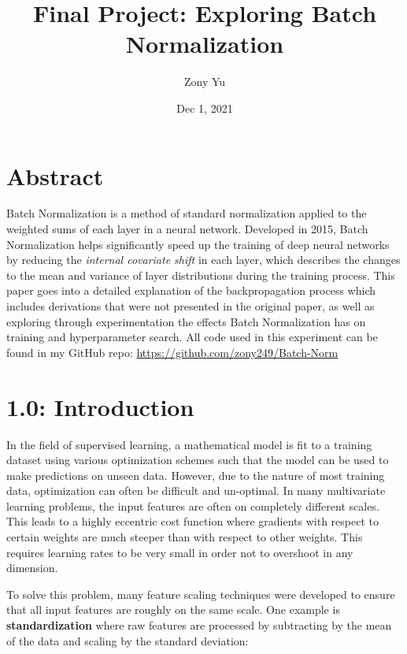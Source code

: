\documentclass{article}
\title{Final Project: Exploring Batch Normalization}
\author{Zony Yu}
\date{Dec 1, 2021}
\begin{document}
\maketitle

\begin{multicols*}{2}






\section*{Abstract}

Batch Normalization is a method of standard normalization applied to the 
weighted sums of each layer in a neural network. Developed in 2015, Batch Normalization
helps significantly speed up the training of deep neural networks by reducing the 
\textit{internal covariate shift} in each layer, which describes the 
changes to the mean and variance of layer distributions during the training process. This
paper goes into a detailed explanation of the backpropagation process which includes
derivations that were not presented in the original paper, as well as exploring through 
experimentation the effects Batch Normalization has on training and hyperparameter search.
All code used in this experiment can be found in my GitHub repo: 
\url{https://github.com/zony249/Batch-Norm}


\section*{1.0: Introduction}
In the field of supervised learning, a mathematical model is fit to 
a training dataset using various optimization schemes such that the model 
can be used to make predictions on unseen data. However, 
due to the nature of most training data, optimization can often be
difficult and un-optimal. In many multivariate learning problems, the input features are
often on completely different scales. This leads to a highly eccentric cost
function where gradients with respect to certain weights are much steeper
than with respect to other weights. This requires learning rates to 
be very small in order not to overshoot in any dimension.

To solve this problem, many feature scaling techniques were developed to ensure
that all input features are roughly on the same scale. One example is \textbf{standardization}\cite{standardization}
where raw features are processed by subtracting by the mean of the data and 
scaling by the standard deviation:


\end{multicols*}
\end{document}
